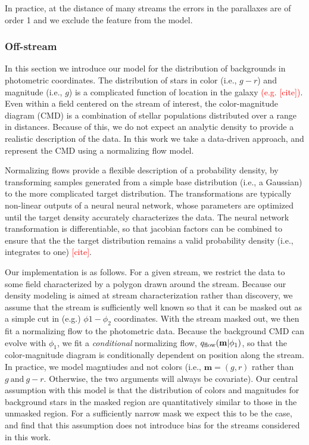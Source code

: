 \documentclass[twocolumn]{aastex631}
\newcommand{\TODO}[1]{{\textcolor{red}{#1}}}
\begin{document}
            In practice, at the distance of many streams the errors in the parallaxes are of order 1 and we exclude the feature from the model.
    
        \subsubsection{Off-stream} \label{sub:photometric_model_off_stream}
            In this section we introduce our model for the distribution of backgrounds in photometric coordinates. 
            The distribution of stars in color (i.e., $g-r$) and magnitude (i.e., $g$) is a complicated function of location in the galaxy \TODO{(e.g. [cite])}. Even within a field centered on the stream of interest, the color-magnitude diagram (CMD) is a combination of stellar populations distributed over a range in distances. Because of this, we do not expect an analytic density to provide a realistic description of the data. In this work we take a data-driven approach, and represent the CMD using a normalizing flow model.

            Normalizing flows provide a flexible description of a probability density, by transforming samples generated from a simple base distribution (i.e., a Gaussian) to the more complicated target distribution. The transformations are typically non-linear outputs of a neural neural network, whose parameters are optimized until the target density accurately characterizes the data. The neural network transformation is differentiable, so that jacobian factors can be combined to ensure that the the target distribution remains a valid probability density (i.e., integrates to one) \TODO{[cite]}.  

            Our implementation is as follows. For a given stream, we restrict the data to some field characterized by a polygon drawn around the stream. Because our density modeling is aimed at stream characterization rather than discovery, we assume that the stream is sufficiently well known so that it can be masked out as a simple cut in (e.g.) $\phi1-\phi_2$ coordinates. With the stream masked out, we then fit a normalizing flow to the photometric data. Because the background CMD can evolve with $\phi_1$, we fit a \emph{conditional} normalizing flow, $q_{\rm flow}(\mathbf{m}|\phi_1)$, so that the color-magnitude diagram is conditionally dependent on position along the stream. In practice, we model magntiudes and not colors (i.e., $\mathbf{m} = (g,r)$ rather than $g \ \mathrm{and} \ g-r$. Otherwise, the two arguments will always be covariate). Our central assumption with this model is that the distribution of colors and magnitudes for background stars in the masked region are quantitatively similar to those in the unmasked region. For a sufficiently narrow mask we expect this to be the case, and find that this assumption does not introduce bias for the streams considered in this work.
                
\end{document}
